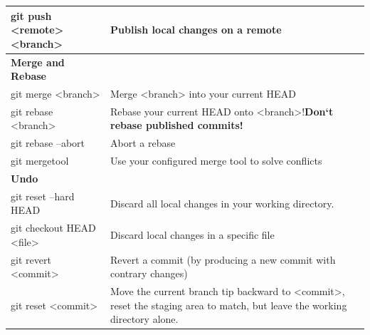 \begin{longtable}{| p{} | p{} |}
	git push <remote> <branch>&
	Publish local changes on a remote
	\\ \hline \hline
	
	\textbf{ Merge and Rebase}&
	\\\hline 
	
	\hline
	git merge <branch>&
	Merge <branch> into your current HEAD
	\\ \hline 
	
	git rebase <branch>& 
	Rebase your current HEAD onto <branch>!\textbf{Don‘t rebase published commits!}
	\\ \hline 
	
	git rebase --abort&
	Abort a rebase
	\\ \hline 
	
	git mergetool& 
	Use your configured merge tool to solve conflicts
	\\ \hline \hline
	
	\textbf{Undo}&
	\\\hline 
	
	\hline
	git reset --hard HEAD&
	Discard all local changes in your working directory.
	\\ \hline  
	
	git checkout HEAD <file>&
	Discard local changes in a specific file
	\\ \hline   
	
	git revert <commit>&
	Revert a commit (by producing a new commit with contrary changes)
	\\ \hline    
	
	git reset <commit>&
	Move the current branch tip backward to <commit>, reset the staging area to match, but leave the working directory alone. 
	\\ \hline
\end{longtable}
\clearpage



